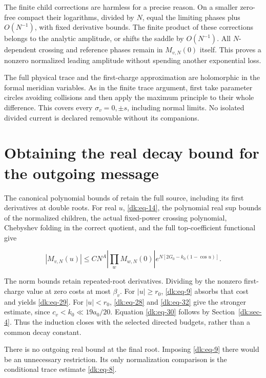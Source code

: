 The finite child corrections are harmless for a precise reason.
On a smaller zero-free compact their logarithms, divided by $N$,
equal the limiting phases plus $O(N^{-1})$, with fixed derivative
bounds. The finite product of these corrections belongs to the
analytic amplitude, or shifts the saddle by $O(N^{-1})$. All
$N$-dependent crossing and reference phases remain in
$M_{v,N}(0)$ itself. This proves a nonzero normalized leading
amplitude without spending another exponential loss.

The full physical trace and the first-charge approximation are
holomorphic in the formal meridian variables. As in the finite trace argument, first take parameter circles avoiding collisions and then apply
the maximum principle to their whole difference. This covers every
\(\sigma_v=0,\pm s\), including normal limits. No isolated divided
current is declared removable without its companions.

\section{Obtaining the real decay bound for the outgoing message}\label{dk:sec-6}

The canonical polynomial bounds of
\cite[Lemma~2.1]{CircleTreeVolume} retain the full source, including
its first derivatives at double roots. For real \(u\), \eqref{dk:eq-14},
the polynomial real sup bounds of the normalized children, the actual
fixed-power crossing polynomial, Chebyshev folding in the correct
quotient, and the full top-coefficient functional give

\begin{equation}\label{dk:eq-43}
|M_{v,N}(u)|\le CN^A
       \left|\prod_wM_{w,N}(0)\right|
                  e^{N[2G_0-k_0(1-\cos u)]}.
\end{equation}

The norm bounds retain repeated-root derivatives. Dividing
by the nonzero first-charge value at zero costs at most \(\beta_v\). For
\(|u|\ge r_0\), \eqref{dk:eq-9} absorbs that cost and yields \eqref{dk:eq-29}. For \(|u|<r_0\), \eqref{dk:eq-28}
and \eqref{dk:eq-32} give the stronger estimate, since \(c_v<k_0\ll19a_0/20\).
Equation \eqref{dk:eq-30} follows by Section~\ref{dk:sec-4}. Thus the induction closes with
the selected directed budgets, rather than a common decay constant.

There is no outgoing real bound at the final root. Imposing \eqref{dk:eq-9} there
would be an unnecessary restriction. Its only normalization comparison
is the conditional trace estimate \eqref{dk:eq-8}.

